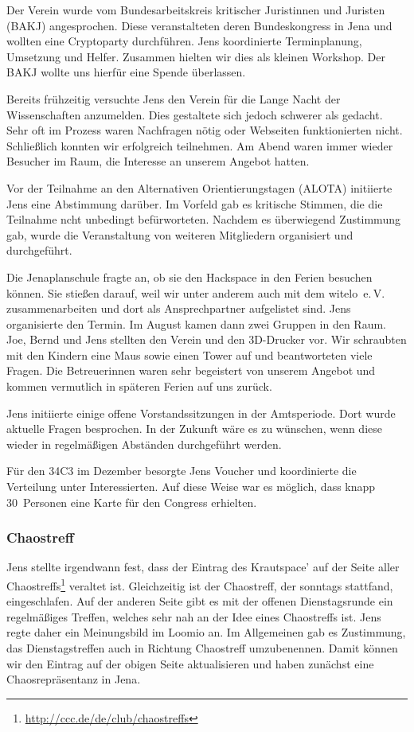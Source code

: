 \documentclass[ngerman]{scrartcl}
\begin{document}
Der Verein wurde vom Bundesarbeitskreis kritischer Juristinnen und Juristen (BAKJ)
angesprochen. Diese veranstalteten deren Bundeskongress in Jena und wollten eine
Cryptoparty durchführen. Jens koordinierte Terminplanung, Umsetzung und
Helfer. Zusammen hielten wir dies als kleinen Workshop. Der BAKJ wollte uns
hierfür eine Spende überlassen.

Bereits frühzeitig versuchte Jens den Verein für die Lange Nacht der
Wissenschaften anzumelden. Dies gestaltete sich jedoch schwerer als
gedacht. Sehr oft im Prozess waren Nachfragen nötig oder Webseiten
funktionierten nicht. Schließlich konnten wir erfolgreich teilnehmen. Am Abend
waren immer wieder Besucher im Raum, die Interesse an unserem Angebot
hatten.

Vor der Teilnahme an den Alternativen Orientierungstagen (ALOTA) initiierte Jens
eine Abstimmung darüber. Im Vorfeld gab es kritische Stimmen, die die Teilnahme
ncht unbedingt befürworteten. Nachdem es überwiegend Zustimmung gab, wurde die
Veranstaltung von weiteren Mitgliedern organisiert und durchgeführt.

Die Jenaplanschule fragte an, ob sie den Hackspace in den Ferien besuchen
können. Sie stießen darauf, weil wir unter anderem auch mit dem
witelo~e.\,V. zusammenarbeiten und dort als Ansprechpartner aufgelistet
sind. Jens organisierte den Termin. Im August kamen dann zwei Gruppen in den
Raum. Joe, Bernd und Jens stellten den Verein und den 3D-Drucker vor. Wir
schraubten mit den Kindern eine Maus sowie einen Tower auf und beantworteten
viele Fragen. Die Betreuerinnen waren sehr begeistert von unserem Angebot und
kommen vermutlich in späteren Ferien auf uns zurück.

Jens initiierte einige offene Vorstandssitzungen in der Amtsperiode. Dort wurde
aktuelle Fragen besprochen. In der Zukunft wäre es zu wünschen, wenn diese
wieder in regelmäßigen Abständen durchgeführt werden.

Für den 34C3 im Dezember besorgte Jens Voucher und koordinierte die Verteilung
unter Interessierten. Auf diese Weise war es möglich, dass knapp 30~Personen
eine Karte für den Congress erhielten.


\subsubsection{Chaostreff}
\label{sec:ct}

Jens stellte irgendwann fest, dass der Eintrag des Krautspace' auf der Seite
aller Chaostreffs\footnote{\url{http://ccc.de/de/club/chaostreffs}} veraltet
ist. Gleichzeitig ist der Chaostreff, der sonntags stattfand, eingeschlafen. Auf
der anderen Seite gibt es mit der offenen Dienstagsrunde ein regelmäßiges
Treffen, welches sehr nah an der Idee eines Chaostreffs ist. Jens regte daher
ein Meinungsbild im Loomio an. Im Allgemeinen gab es Zustimmung, das
Dienstagstreffen auch in Richtung Chaostreff umzubenennen. Damit können wir den
Eintrag auf der obigen Seite aktualisieren und haben zunächst eine
Chaosrepräsentanz in Jena.
\end{document}
